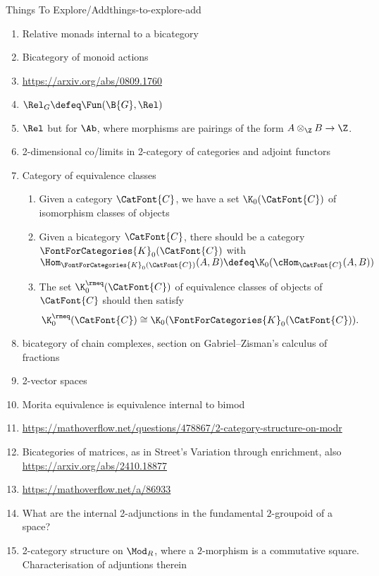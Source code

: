 \begin{remark}{Things To Explore/Add}{things-to-explore-add}
\begin{enumerate}
        \item Relative monads internal to a bicategory
        \item Bicategory of monoid actions
        \item \url{https://arxiv.org/abs/0809.1760}
        \item $\Rel_{G}\defeq\Fun(\B{G},\Rel)$
        \item $\Rel$ but for $\Ab$, where morphisms are pairings of the form $A\otimes_{\Z}B\to\Z$.
        \item 2-dimensional co/limits in 2-category of categories and adjoint functors
        \item Category of equivalence classes
            \begin{enumerate}
                \item Given a category $\CatFont{C}$, we have a set $\K_{0}(\CatFont{C})$ of isomorphism classes of objects
                \item Given a bicategory $\CatFont{C}$, there should be a category $\FontForCategories{K}_{0}(\CatFont{C})$ with $\Hom_{\FontForCategories{K}_{0}(\CatFont{C})}(A,B)\defeq\K_{0}(\cHom_{\CatFont{C}}(A,B))$
                \item The set $\K^{\rmeq}_{0}(\CatFont{C})$ of equivalence classes of objects of $\CatFont{C}$ should then satisfy
                    \[
                        \K^{\rmeq}_{0}(\CatFont{C})%
                        \cong%
                        \K_{0}(\FontForCategories{K}_{0}(\CatFont{C})).
                    \]%
            \end{enumerate}
        \item bicategory of chain complexes, section  on Gabriel--Zisman's calculus of fractions
        \item 2-vector spaces
        \item Morita equivalence is equivalence internal to bimod
        \item \url{https://mathoverflow.net/questions/478867/2-category-structure-on-modr}
        \item Bicategories of matrices, as in Street's Variation through enrichment, also \url{https://arxiv.org/abs/2410.18877}
        \item \url{https://mathoverflow.net/a/86933}
        \item What are the internal 2-adjunctions in the fundamental $2$-groupoid of a space?
        \item 2-category structure on $\Mod_{R}$, where a $2$-morphism is a commutative square. Characterisation of adjuntions therein

\end{enumerate}
\end{remark}
